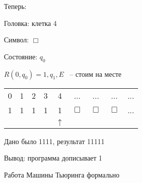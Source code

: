 \documentclass[russian]{lecture-notes}
\begin{document}
\begin{example}
        Теперь:

        Головка: клетка 4

        Символ: $\Box$

        Состояние: $q_0$

        $R(0, q_0) = 1, q_1, E$ ~-- стоим на месте

        \begin{table}[H]

            \centering
            \begin{tabular}{ *{9}{c} }
                \cline{1-9}
                \multicolumn{1}{|c}{0} &
                \multicolumn{1}{|c}{1} &
                \multicolumn{1}{|c}{2} &
                \multicolumn{1}{|c}{3} &
                \multicolumn{1}{|c}{4} &
                \multicolumn{1}{|c}{...} &
                \multicolumn{1}{|c}{...} &
                \multicolumn{1}{|c}{...} &
                \multicolumn{1}{|c|}{...} \\
                \cline{1-9}
                \cline{1-9}
                \multicolumn{1}{|c}{1} &
                \multicolumn{1}{|c}{1} &
                \multicolumn{1}{|c}{1} &
                \multicolumn{1}{|c}{1} &
                \multicolumn{1}{|c}{1} &
                \multicolumn{1}{|c}{$\Box$} &
                \multicolumn{1}{|c}{$\Box$} &
                \multicolumn{1}{|c}{$\Box$} &
                \multicolumn{1}{|c|}{...} \\
                \cline{1-9}
                & & & & $\uparrow$
            \end{tabular}
        \end{table}

        Дано было 1111, результат 11111

        Вывод: программа дописывает 1

        Работа Машины Тьюринга формально
    \end{example}
\end{document}
